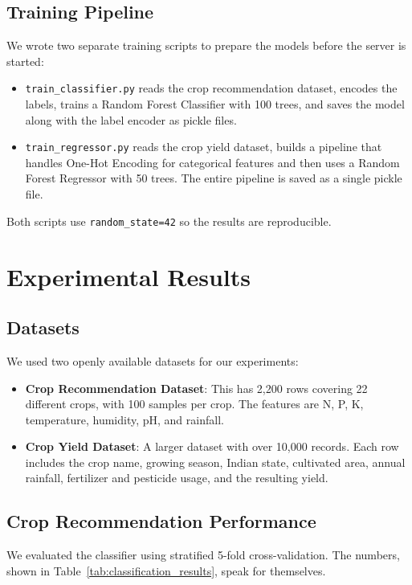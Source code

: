 \documentclass[conference]{IEEEtran}
\begin{document}
\subsection{Training Pipeline}
We wrote two separate training scripts to prepare the models before the server is started:

\begin{itemize}
    \item \texttt{train\_classifier.py} reads the crop recommendation dataset, encodes the labels, trains a Random Forest Classifier with 100 trees, and saves the model along with the label encoder as pickle files.
    \item \texttt{train\_regressor.py} reads the crop yield dataset, builds a pipeline that handles One-Hot Encoding for categorical features and then uses a Random Forest Regressor with 50 trees. The entire pipeline is saved as a single pickle file.
\end{itemize}

Both scripts use \texttt{random\_state=42} so the results are reproducible.

\section{Experimental Results}
\label{sec:results}

\subsection{Datasets}
We used two openly available datasets for our experiments:

\begin{itemize}
    \item \textbf{Crop Recommendation Dataset}: This has 2,200 rows covering 22 different crops, with 100 samples per crop. The features are N, P, K, temperature, humidity, pH, and rainfall.
    \item \textbf{Crop Yield Dataset}: A larger dataset with over 10,000 records. Each row includes the crop name, growing season, Indian state, cultivated area, annual rainfall, fertilizer and pesticide usage, and the resulting yield.
\end{itemize}

\subsection{Crop Recommendation Performance}
We evaluated the classifier using stratified 5-fold cross-validation. The numbers, shown in Table~\ref{tab:classification_results}, speak for themselves.
\end{document}
